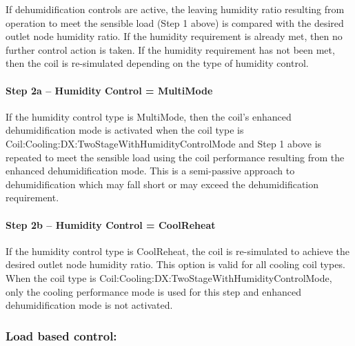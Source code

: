 If dehumidification controls are active, the leaving humidity ratio resulting from operation to meet the sensible load (Step 1 above) is compared with the desired outlet node humidity ratio. If the humidity requirement is already met, then no further control action is taken. If the humidity requirement has not been met, then the coil is re-simulated depending on the type of humidity control.

\paragraph{Step 2a -- Humidity Control = MultiMode}\label{step-2a-humidity-control-multimode}

If the humidity control type is MultiMode, then the coil's enhanced dehumidification mode is activated when the coil type is Coil:Cooling:DX:TwoStageWithHumidityControlMode and Step 1 above is repeated to meet the sensible load using the coil performance resulting from the enhanced dehumidification mode. This is a semi-passive approach to dehumidification which may fall short or may exceed the dehumidification requirement.

\paragraph{Step 2b -- Humidity Control = CoolReheat}\label{step-2b-humidity-control-coolreheat}

If the humidity control type is CoolReheat, the coil is re-simulated to achieve the desired outlet node humidity ratio. This option is valid for all cooling coil types. When the coil type is Coil:Cooling:DX:TwoStageWithHumidityControlMode, only the cooling performance mode is used for this step and enhanced dehumidification mode is not activated.

\subsubsection{Load based control:}\label{load-based-control}

